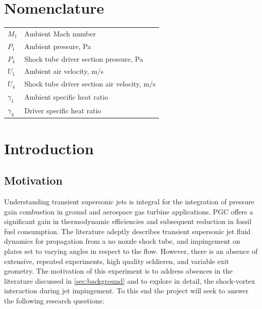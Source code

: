 \section*{Nomenclature}
\begin{table}[H]
\begin{tabular}{ll} \smallskip
$M_1$      & Ambient Mach number                         \\ \smallskip
$P_1$      & Ambient pressure, Pa                        \\ \smallskip
$P_4$      & Shock tube driver section pressure, Pa      \\ \smallskip
$U_1$      & Ambient air velocity, m/s                   \\ \smallskip
$U_4$      & Shock tube driver section air velocity, m/s \\ \smallskip
$\gamma_1$ & Ambient specific heat ratio                 \\ \smallskip
$\gamma_4$ & Driver specific heat ratio                 
\end{tabular}
\end{table}
 


\newpage
{}
\section{Introduction} 

\subsection{Motivation}
Understanding transient supersonic jets is integral for the integration of pressure gain combustion in ground and aerospace gas turbine applications. PGC offers a significant gain in thermodynamic efficiencies and subsequent reduction in fossil fuel consumption. The literature adeptly describes transient supersonic jet fluid dynamics for propagation from a no nozzle shock tube, and impingement on plates set to varying angles in respect to the flow. However, there is an absence of extensive, repeated experiments, high quality schlieren, and variable exit geometry. The motivation of this experiment is to address  absences in the literature discussed in \ref{sec:background} and to explore in detail, the shock-vortex interaction during jet impingement. To this end the project will seek to answer the following research questions:

